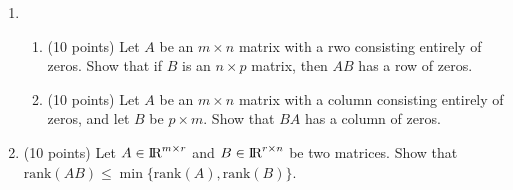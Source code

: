 \documentclass[11pt]{article}
\begin{document}
\begin{enumerate}
\item 
\begin{enumerate}
\item (10 points) Let $A$ be an $m \times n$ matrix with a rwo consisting entirely of zeros. 
Show that if $B$ is an $n \times p$ matrix, then $AB$ has a row of zeros. 
\item (10 points) Let $A$ be an $m \times n$ matrix with a column consisting entirely of zeros, 
and let $B$ be $p\times m$. Show that $BA$ has a column of zeros. 
\end{enumerate}

\item  (10 points)
Let $A \in {\rm\hbox{I\kern-.15em R}}^{m\times r}$ and $B \in {\rm\hbox{I\kern-.15em R}}^{r \times n}$ be two matrices. 
Show that $\mbox{rank}(AB) \leq \min\{\mbox{rank}(A), \mbox{rank}(B)\}$. 
\end{enumerate}
\end{document}
